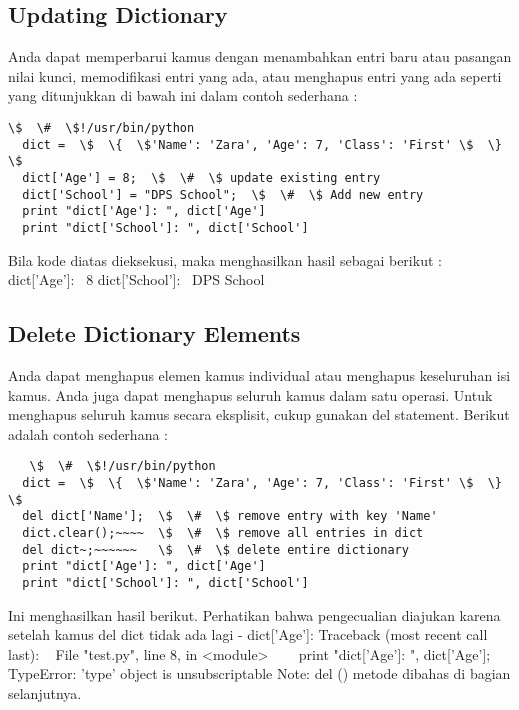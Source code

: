 \subsection{Updating Dictionary}
Anda dapat memperbarui kamus dengan menambahkan entri baru atau pasangan nilai kunci, memodifikasi entri yang ada, atau menghapus entri yang ada seperti yang ditunjukkan di bawah ini dalam contoh sederhana :
\begin{verbatim}
\$  \#  \$!/usr/bin/python 
  dict =  \$  \{  \$'Name': 'Zara', 'Age': 7, 'Class': 'First' \$  \}  \$ 
  dict['Age'] = 8;  \$  \#  \$ update existing entry
  dict['School'] = "DPS School";  \$  \#  \$ Add new entry
  print "dict['Age']: ", dict['Age']
  print "dict['School']: ", dict['School']
\end{verbatim}
Bila kode diatas dieksekusi, maka menghasilkan hasil sebagai berikut : 
  dict['Age']:~ 8 
  dict['School']:~ DPS School 
  
\subsection{Delete Dictionary Elements}
Anda dapat menghapus elemen kamus individual atau menghapus keseluruhan isi kamus. Anda juga dapat menghapus seluruh kamus dalam satu operasi. 
Untuk menghapus seluruh kamus secara eksplisit, cukup gunakan del statement. Berikut adalah contoh sederhana : 
\begin{verbatim}   
   \$  \#  \$!/usr/bin/python
  dict =  \$  \{  \$'Name': 'Zara', 'Age': 7, 'Class': 'First' \$  \}  \$
  del dict['Name'];  \$  \#  \$ remove entry with key 'Name'
  dict.clear();~~~~  \$  \#  \$ remove all entries in dict 
  del dict~;~~~~~~   \$  \#  \$ delete entire dictionary 
  print "dict['Age']: ", dict['Age'] 
  print "dict['School']: ", dict['School']
\end{verbatim}  
Ini menghasilkan hasil berikut. Perhatikan bahwa pengecualian diajukan karena setelah kamus del dict tidak ada lagi - 
  dict['Age']: 
  Traceback (most recent call last): 
~   File "test.py", line 8, in <module> 
~~~     print "dict['Age']: ", dict['Age']; 
  TypeError: 'type' object is unsubscriptable 
Note: del () metode dibahas di bagian selanjutnya. 

